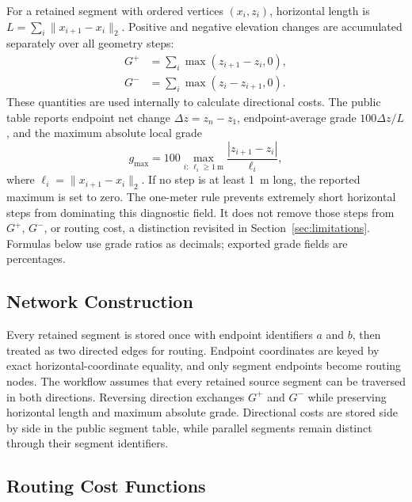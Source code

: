 \documentclass[twocolumn,10pt]{article}
\begin{document}
For a retained segment with ordered vertices \((x_i,z_i)\), horizontal length is \(L=\sum_i\lVert x_{i+1}-x_i\rVert_2\). Positive and negative elevation changes are accumulated separately over all geometry steps:
\begin{equation}
  \begin{aligned}
    G^+ & = \sum_i \max(z_{i+1}-z_i,0), \\
    G^- & = \sum_i \max(z_i-z_{i+1},0).
  \end{aligned}
\end{equation}
These quantities are used internally to calculate directional costs. The public table reports endpoint net change \(\Delta z=z_n-z_1\), endpoint-average grade \(100\Delta z/L\), and the maximum absolute local grade
\begin{equation}
  g_{\max}=100\max_{i:\,\ell_i\geq \SI{1}{\meter}}
  \frac{|z_{i+1}-z_i|}{\ell_i},
\end{equation}
where \(\ell_i=\lVert x_{i+1}-x_i\rVert_2\). If no step is at least \SI{1}{\meter} long, the reported maximum is set to zero. The one-meter rule prevents extremely short horizontal steps from dominating this diagnostic field. It does not remove those steps from \(G^+\), \(G^-\), or routing cost, a distinction revisited in Section~\ref{sec:limitations}. Formulas below use grade ratios as decimals; exported grade fields are percentages.

\subsection{Network Construction}

Every retained segment is stored once with endpoint identifiers \(a\) and \(b\), then treated as two directed edges for routing. Endpoint coordinates are keyed by exact horizontal-coordinate equality, and only segment endpoints become routing nodes. The workflow assumes that every retained source segment can be traversed in both directions. Reversing direction exchanges \(G^+\) and \(G^-\) while preserving horizontal length and maximum absolute grade. Directional costs are stored side by side in the public segment table, while parallel segments remain distinct through their segment identifiers.

\subsection{Routing Cost Functions}
\end{document}
